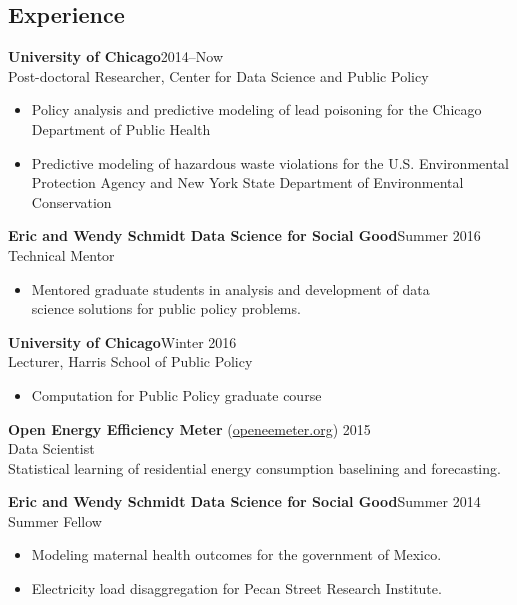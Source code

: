 \documentclass[margin,line]{resume}
\begin{document}
\address{epotash@uchicago.edu / \href{http://www.k2co3.net}{k2co3.net} / \href{https://github.com/potash}{github.com/potash}}
\begin{resume}
\section{\mysidestyle Experience}
	{\bf University of Chicago}\hfill{2014--Now}\\
	Post-doctoral Researcher, Center for Data Science and Public Policy
	\begin{itemize}
		\item Policy analysis and predictive modeling of lead poisoning for the Chicago\\Department of Public Health
		\item Predictive modeling of hazardous waste violations for the U.S. Environmental\\ Protection Agency and New York State Department of Environmental\\ Conservation
	\end{itemize}

        {\bf Eric and Wendy Schmidt Data Science for Social Good}\hfill{Summer 2016}\\
	Technical Mentor
	\begin{itemize}
		\item Mentored graduate students in analysis and development of data\\science solutions for public policy problems.
	\end{itemize}


        {\bf University of Chicago}\hfill{Winter 2016}\\
        Lecturer, Harris School of Public Policy
	\begin{itemize}
		\item Computation for Public Policy graduate course
	\end{itemize}

	{\bf Open Energy Efficiency Meter} (\href{http://www.openeemeter.org/}{openeemeter.org}) \hfill {2015} \\
	Data Scientist \\
	Statistical learning of residential energy consumption baselining and forecasting.

	{\bf Eric and Wendy Schmidt Data Science for Social Good}\hfill{Summer 2014}\\
	Summer Fellow
	\begin{itemize}
		\item Modeling maternal health outcomes for the government of Mexico.
		\item Electricity load disaggregation for Pecan Street Research Institute.
	\end{itemize}


\end{resume}
\end{document}
